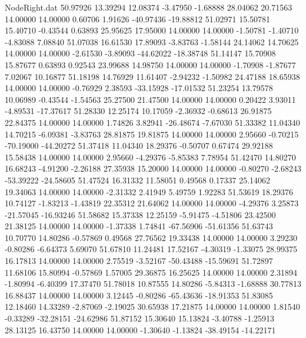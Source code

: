 \begin{filecontents}{NodeRight.dat}
  50.97926   13.39294   12.08374    -3.47950   -1.68888   28.04062   20.71563   14.00000   14.00000    0.60706    1.91626  -40.97436  -19.88812
  51.02971   15.50781   15.40710    -0.43544    0.63893   25.95625   17.95000   14.00000   14.00000   -1.50781   -1.40710   -4.83088    7.08840
  51.07038   16.61530   17.89093    -3.83763   -1.58144   24.14062   14.70625   14.00000   14.00000   -2.61530   -3.89093  -44.62022  -18.38748
  51.14147   15.70908   15.87677     0.63893    0.92543   23.99688   14.98750   14.00000   14.00000   -1.70908   -1.87677    7.02067   10.16877
  51.18198   14.76929   11.61407    -2.94232   -1.50982   24.47188   18.65938   14.00000   14.00000   -0.76929    2.38593  -33.15928  -17.01532
  51.23254   13.79578   10.06989    -0.43544   -1.54563   25.27500   21.47500   14.00000   14.00000    0.20422    3.93011   -4.89531  -17.37617
  51.28330   12.25174   10.17059    -2.36932   -0.68613   26.91875   22.84375   14.00000   14.00000    1.74826    3.82941  -26.48674   -7.67030
  51.33382   11.04340   14.70215    -6.09381   -3.83763   28.81875   19.81875   14.00000   14.00000    2.95660   -0.70215  -70.19000  -44.20272
  51.37418   11.04340   18.29376    -0.50707    0.67474   29.92188   15.58438   14.00000   14.00000    2.95660   -4.29376   -5.85383    7.78954
  51.42470   14.80270   16.68243    -4.91200   -2.26188   27.35938   15.20000   14.00000   14.00000   -0.80270   -2.68243  -53.39222  -24.58605
  51.47524   16.31332   11.58051     0.49568    0.17337   25.14062   19.34063   14.00000   14.00000   -2.31332    2.41949    5.49759    1.92283
  51.53619   18.29376   10.74127    -1.83213   -1.43819   22.35312   21.64062   14.00000   14.00000   -4.29376    3.25873  -21.57045  -16.93246
  51.58682   15.37338   12.25159    -5.91475   -4.51806   23.42500   21.38125   14.00000   14.00000   -1.37338    1.74841  -67.56906  -51.61356
  51.63743   10.70770   14.80286    -0.57869    0.49568   27.76562   19.33438   14.00000   14.00000    3.29230   -0.80286   -6.64373    5.69070
  51.67810   11.24481   17.52167    -4.30319   -1.33075   28.99375   16.17813   14.00000   14.00000    2.75519   -3.52167  -50.43488  -15.59691
  51.72897   11.68106   15.80994    -0.57869    1.57005   29.36875   16.25625   14.00000   14.00000    2.31894   -1.80994   -6.40399   17.37470
  51.78018   10.87555   14.80286    -5.84313   -1.68888   30.77813   16.88437   14.00000   14.00000    3.12445   -0.80286  -65.43636  -18.91353
  51.83085   12.18460   14.33289    -2.87069   -2.19025   30.65938   17.21875   14.00000   14.00000    1.81540   -0.33289  -32.28151  -24.62986
  51.87152   15.30640   15.13824    -3.40788   -1.25913   28.13125   16.43750   14.00000   14.00000   -1.30640   -1.13824  -38.49154  -14.22171

\end{filecontents}
